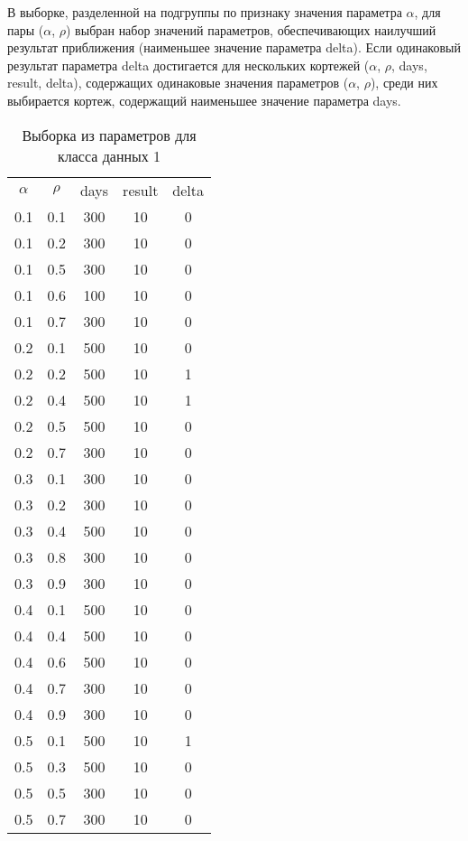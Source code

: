 В выборке, разделенной на подгруппы по признаку значения параметра $\alpha$, для пары ($\alpha$, $\rho$) выбран набор значений параметров, обеспечивающих наилучший результат приближения (наименьшее значение параметра delta). Если одинаковый результат параметра delta достигается для нескольких кортежей ($\alpha$, $\rho$, days, result, delta), содержащих одинаковые значения параметров ($\alpha$, $\rho$), среди них выбирается кортеж, содержащий наименьшее значение параметра days. 
\pagebreak
\begin{center}
	\label{table_kd1}
	\begin{longtable}[c]{|c|c|c|c|c|}
		\captionsetup{justification=raggedright,singlelinecheck=off}
		\caption{Выборка из параметров для класса данных 1}\\
		\hline
		$\alpha$ & $\rho$ & days & result & delta \\ \hline
		0.1 & 0.1 & 300 & 10 & 0 \\
		0.1 & 0.2 & 300 & 10 & 0 \\
		0.1 & 0.5 & 300 & 10 & 0 \\
		0.1 & 0.6 & 100 & 10 & 0 \\
		0.1 & 0.7 & 300 & 10 & 0 \\ \hline
		0.2 & 0.1 & 500 & 10 & 0 \\
		0.2 & 0.2 & 500 & 10 & 1 \\
		0.2 & 0.4 & 500 & 10 & 1 \\
		0.2 & 0.5 & 500 & 10 & 0 \\
		0.2 & 0.7 & 300 & 10 & 0 \\ \hline
		0.3 & 0.1 & 300 & 10 & 0 \\
		0.3 & 0.2 & 300 & 10 & 0 \\
		0.3 & 0.4 & 500 & 10 & 0 \\
		0.3 & 0.8 & 300 & 10 & 0 \\
		0.3 & 0.9 & 300 & 10 & 0 \\ \hline
		0.4 & 0.1 & 500 & 10 & 0 \\
		0.4 & 0.4 & 500 & 10 & 0 \\
		0.4 & 0.6 & 500 & 10 & 0 \\
		0.4 & 0.7 & 300 & 10 & 0 \\
		0.4 & 0.9 & 300 & 10 & 0 \\ \hline
		0.5 & 0.1 & 500 & 10 & 1 \\
		0.5 & 0.3 & 500 & 10 & 0 \\
		0.5 & 0.5 & 300 & 10 & 0 \\
		0.5 & 0.7 & 300 & 10 & 0 \\

\end{longtable}
\end{center}
